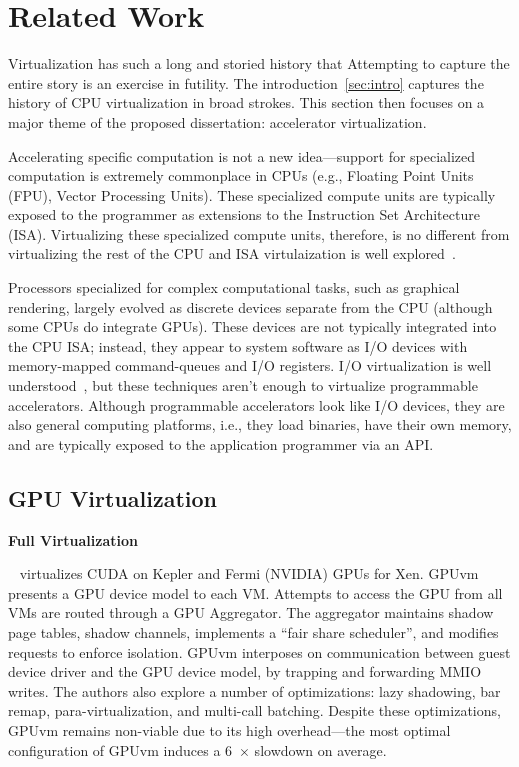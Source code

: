 \chapter{Related Work}
\label{sec:related}

Virtualization has such a long and storied history that Attempting to capture
the entire story is an exercise in futility. The introduction~\ref{sec:intro}
captures the history of CPU virtualization in broad strokes. This section then
focuses on a major theme of the proposed dissertation:
accelerator virtualization.

Accelerating specific computation is not a new idea---support for specialized
computation is extremely commonplace in CPUs (e.g., Floating Point Units
(FPU), Vector Processing Units). These specialized compute units are
typically exposed to the programmer as extensions to the Instruction Set
Architecture (ISA). Virtualizing these specialized compute units, therefore,
is no different from virtualizing the rest of the CPU and ISA virtulaization
is well explored~\cite{cp40,vm370,popek-goldberg,bugnion-disco,
bugnion-nieh-tsafrir,bugnion-workstation}.

Processors specialized for complex computational tasks, such as graphical
rendering, largely evolved as discrete devices separate from the CPU (although
some CPUs do integrate GPUs). These devices are not typically integrated into
the CPU ISA; instead, they appear to system software as I/O devices with
memory-mapped command-queues and I/O registers. I/O virtualization is well
understood~\cite{waldspurger12cacm,paradice,Kuperman_undated-io,Sig2010-ml,
zeng2013improved,abramson2006intel}, but these techniques aren't enough to
virtualize programmable accelerators. Although programmable accelerators look
like I/O devices, they are also general computing platforms, i.e., they load
binaries, have their own memory, and are typically exposed to the application
programmer via an API.

\section{GPU Virtualization}



{\noindent \bf \large Full Virtualization}

~\cite{suzuki2014gpuvm} virtualizes CUDA on Kepler and
Fermi (NVIDIA) GPUs for Xen. GPUvm presents a GPU device model to each VM.
Attempts to access the GPU from all VMs are routed through a GPU Aggregator.
The aggregator maintains shadow page tables, shadow channels, implements a
``fair share scheduler'', and modifies requests to enforce isolation. GPUvm
interposes on communication between guest device driver and the GPU device
model, by trapping and forwarding MMIO writes. The authors also explore a
number of optimizations: lazy shadowing, bar remap, para-virtualization, and
multi-call batching. Despite these optimizations, GPUvm remains non-viable due to its high overhead---the most optimal configuration of GPUvm induces a 6~$\times$ slowdown on average.

